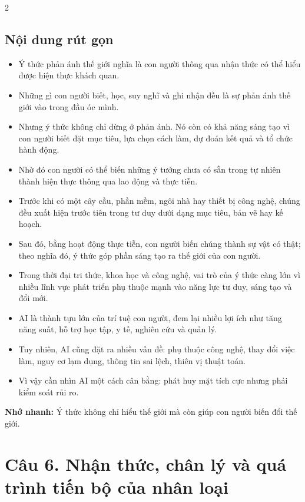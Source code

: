 \documentclass[9pt,a4paper]{extarticle}
\begin{document}
\begin{multicols*}{2}
\subsection*{Nội dung rút gọn}
\begin{itemize}
  \item Ý thức phản ánh thế giới nghĩa là con người thông qua nhận thức có thể hiểu được hiện thực khách quan.
  \item Những gì con người biết, học, suy nghĩ và ghi nhận đều là sự phản ánh thế giới vào trong đầu óc mình.
  \item Nhưng ý thức không chỉ dừng ở phản ánh. Nó còn có khả năng sáng tạo vì con người biết đặt mục tiêu, lựa chọn cách làm, dự đoán kết quả và tổ chức hành động.
  \item Nhờ đó con người có thể biến những ý tưởng chưa có sẵn trong tự nhiên thành hiện thực thông qua lao động và thực tiễn.
  \item Trước khi có một cây cầu, phần mềm, ngôi nhà hay thiết bị công nghệ, chúng đều xuất hiện trước tiên trong tư duy dưới dạng mục tiêu, bản vẽ hay kế hoạch.
  \item Sau đó, bằng hoạt động thực tiễn, con người biến chúng thành sự vật có thật; theo nghĩa đó, ý thức góp phần sáng tạo ra thế giới của con người.
  \item Trong thời đại tri thức, khoa học và công nghệ, vai trò của ý thức càng lớn vì nhiều lĩnh vực phát triển phụ thuộc mạnh vào năng lực tư duy, sáng tạo và đổi mới.
  \item AI là thành tựu lớn của trí tuệ con người, đem lại nhiều lợi ích như tăng năng suất, hỗ trợ học tập, y tế, nghiên cứu và quản lý.
  \item Tuy nhiên, AI cũng đặt ra nhiều vấn đề: phụ thuộc công nghệ, thay đổi việc làm, nguy cơ lạm dụng, thông tin sai lệch, thiên vị thuật toán.
  \item Vì vậy cần nhìn AI một cách cân bằng: phát huy mặt tích cực nhưng phải kiểm soát rủi ro.
\end{itemize}

\textbf{Nhớ nhanh:} Ý thức không chỉ hiểu thế giới mà còn giúp con người biến đổi thế giới.

\section*{Câu 6. Nhận thức, chân lý và quá trình tiến bộ của nhân loại}

\end{multicols*}
\end{document}
